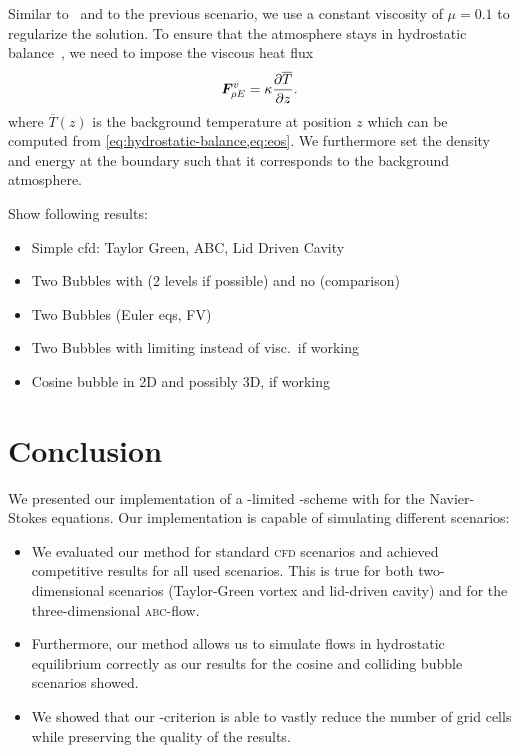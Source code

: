\documentclass[runningheads]{llncs}
\begin{document}
Similar to~\cite{muller2010adaptive} and to the previous scenario, we use a constant viscosity of $\mu = 0.1$ to regularize the solution.
To ensure that the atmosphere stays in hydrostatic balance~\cite{giraldo2008study}, we need to impose the viscous heat flux
\begin{equation}
  \label{eq:atmosphere-bc}
  \viscFlux_{\QE} = \kappa \pdv{\overline{T}}{z}.%
\end{equation}
where $\overline{T}(z)$ is the background temperature at position $z$ which can be computed from \cref{eq:hydrostatic-balance,eq:eos}.
We furthermore set the density and energy at the boundary such that it corresponds to the background atmosphere.


Show following results:
\begin{itemize}
\item Simple cfd: Taylor Green, ABC, Lid Driven Cavity
\item Two Bubbles with \amr{} (2 levels if possible) and no \amr{} (comparison)
\item Two Bubbles (Euler eqs, FV)  
\item Two Bubbles with limiting instead of visc.\ if working  
\item Cosine bubble in 2D and possibly 3D, if working
\end{itemize}

\section{Conclusion}
We presented our implementation of a \muscl{}-limited \aderdg{}-scheme with \amr{} for the Navier-Stokes equations.
Our implementation is capable of simulating different scenarios:
\begin{itemize}
\item We evaluated our method for standard \textsc{cfd} scenarios and achieved competitive results for all used scenarios.
  This is true for both two-dimensional scenarios (Taylor-Green vortex and lid-driven cavity) and for the three-dimensional \textsc{abc}-flow.
\item Furthermore, our method allows us to simulate flows in hydrostatic equilibrium correctly as our results for the cosine and colliding bubble scenarios showed.
\item We showed that our \amr{}-criterion is able to vastly reduce the number of grid cells while preserving the quality of the results.
\end{itemize}
\end{document}
